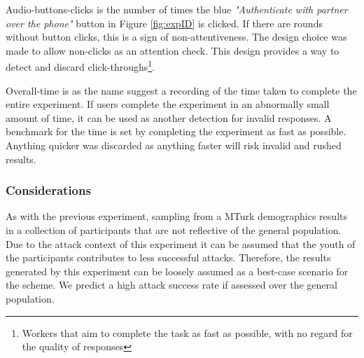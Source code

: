 Audio-buttons-clicks is the number of times the blue \textit{"Authenticate with partner over the phone"} button in Figure \ref{fig:expID} is clicked. If there are rounds without button clicks, this is a sign of non-attentiveness. The design choice was made to allow non-clicks as an attention check. This design provides a way to detect and discard click-throughs\footnote{Workers that aim to complete the task as fast as possible, with no regard for the quality of responses}. 

Overall-time is as the name suggest a recording of the time taken to complete the entire experiment. If users complete the experiment in an abnormally small amount of time, it can be used as another detection for invalid responses. A benchmark for the time is set by completing the experiment as fast as possible. Anything quicker was discarded as anything faster will risk invalid and rushed results.

\subsubsection{Considerations}
As with the previous experiment, sampling from a  MTurk demographics results in a collection of participants that are not reflective of the general population. Due to the attack context of this experiment it can be assumed that the youth of the participants contributes to less successful attacks. Therefore, the results generated by this experiment can be loosely assumed as a best-case scenario for the scheme. We predict a high attack success rate if assessed over the general population.